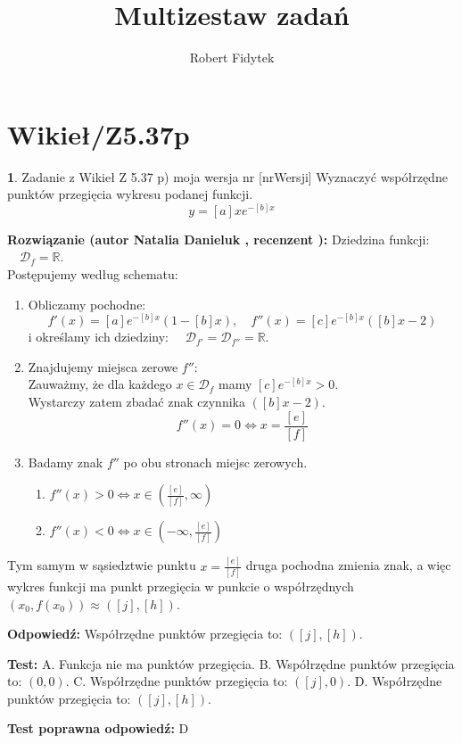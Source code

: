 \documentclass[12pt, a4paper]{article}
\title{Multizestaw zadań}
\author{Robert Fidytek}
\date{}
\theoremstyle{definition} %
\newtheorem{zad}{}
\newcommand{\kategoria}[1]{\section{#1}} %
\newcommand{\zadStart}[1]{\begin{zad}#1\newline} %
\newcommand{\zadStop}{\end{zad}}   %
\newcommand{\rozwStart}[2]{\noindent \textbf{Rozwiązanie (autor #1 , recenzent #2): }\newline} %
\newcommand{\rozwStop}{\newline}                                            %
\newcommand{\odpStart}{\noindent \textbf{Odpowiedź:}\newline}    %
\newcommand{\odpStop}{\newline}                                             %
\newcommand{\testStart}{\noindent \textbf{Test:}\newline} %
\newcommand{\testStop}{\newline} %
\newcommand{\kluczStart}{\noindent \textbf{Test poprawna odpowiedź:}\newline} %
\newcommand{\kluczStop}{\newline} %
\begin{document}
\maketitle

\kategoria{Wikieł/Z5.37p}

\zadStart{Zadanie z Wikieł Z 5.37 p) moja wersja nr [nrWersji]}
Wyznaczyć współrzędne punktów przegięcia wykresu podanej funkcji.
$$y = [a]xe^{-[b]x}$$
\zadStop

\rozwStart{Natalia Danieluk}{}
Dziedzina funkcji: $\quad \mathcal{D}_f=\mathbb{R}$. \\
Postępujemy według schematu:
\begin{enumerate}
\item Obliczamy pochodne: 
$$f'(x) = [a]e^{-[b]x}(1-[b]x),\quad f''(x) = [c]e^{-[b]x}([b]x-2)$$
i określamy ich dziedziny: $\quad \mathcal{D}_{f'}=\mathcal{D}_{f''}=\mathbb{R}$. \\
\item Znajdujemy miejsca zerowe $f''$:\\
Zauważmy, że dla każdego $x \in \mathcal{D}_f$ mamy $[c]e^{-[b]x} > 0$. \\
Wystarczy zatem zbadać znak czynnika $([b]x-2)$.
$$f''(x)=0 \Leftrightarrow x=\frac{[e]}{[f]}$$
\item Badamy znak $f''$ po obu stronach miejsc zerowych. \\
	\begin{enumerate}
	\item $f''(x) > 0 \Leftrightarrow x \in (\frac{[e]}{[f]},\infty)$\\
	\item $f''(x) < 0 \Leftrightarrow x \in (-\infty,\frac{[e]}{[f]})$
	\end{enumerate}
\end{enumerate}
Tym samym w sąsiedztwie punktu $x=\frac{[e]}{[f]}$ druga pochodna zmienia znak, a więc wykres funkcji ma punkt przegięcia w punkcie o współrzędnych $(x_0,f(x_0)) \approx ([j],[h])$.
\rozwStop

\odpStart
Współrzędne punktów przegięcia to: $([j],[h])$.
\odpStop

\testStart
A. Funkcja nie ma punktów przegięcia.
B. Współrzędne punktów przegięcia to: $(0,0)$.
C. Współrzędne punktów przegięcia to: $([j],0)$.
D. Współrzędne punktów przegięcia to: $([j],[h])$.
\testStop

\kluczStart
D
\kluczStop
\end{document}
